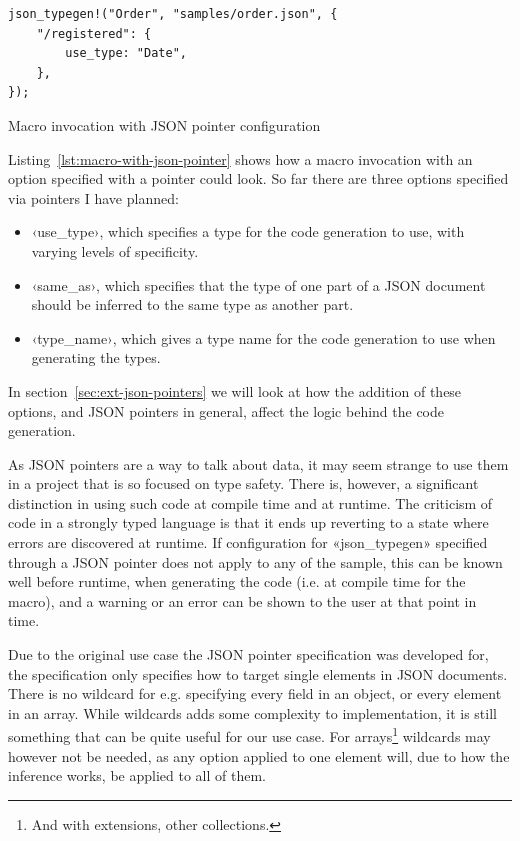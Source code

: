 \begin{listing}[ht!]
\begin{verbatim}
json_typegen!("Order", "samples/order.json", {
    "/registered": {
        use_type: "Date",
    },
});
\end{verbatim}
\caption{Macro invocation with JSON pointer configuration}
\label{lst:macro-with-json-pointer}
\end{listing}

Listing~\ref{lst:macro-with-json-pointer} shows how a macro invocation with an option specified with a pointer could look. So far there are three options specified via pointers I have planned:

\begin{itemize}
  \item ‹use_type›, which specifies a type for the code generation to use, with varying levels of specificity.
  \item ‹same_as›, which specifies that the type of one part of a JSON document should be inferred to the same type as another part.
  \item ‹type_name›, which gives a type name for the code generation to use when generating the types.
\end{itemize}

In section~\ref{sec:ext-json-pointers} we will look at how the addition of these options, and JSON pointers in general, affect the logic behind the code generation.

As JSON pointers are a  way to talk about data, it may seem strange to use them in a project that is so focused on type safety. There is, however, a significant distinction in using such code at compile time and at runtime. The criticism of  code in a strongly typed language is that it ends up reverting to a state where errors are discovered at runtime. If configuration for «json_typegen» specified through a JSON pointer does not apply to any of the sample, this can be known well before runtime, when generating the code (i.e. at compile time for the macro), and a warning or an error can be shown to the user at that point in time.

Due to the original use case the JSON pointer specification was developed for, the specification only specifies how to target single elements in JSON documents. There is no wildcard for e.g. specifying every field in an object, or every element in an array. While wildcards adds some complexity to implementation, it is still something that can be quite useful for our use case. For arrays\footnote{And with extensions, other collections.} wildcards may however not be needed, as any option applied to one element will, due to how the inference works, be applied to all of them.

